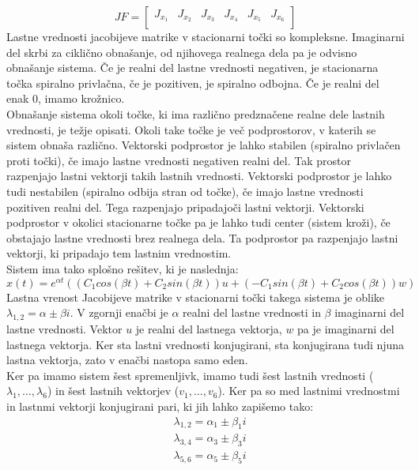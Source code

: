 \documentclass[a4paper, 12pt]{article}
\begin{document}
\begin{equation}
	JF =
	\begin{bmatrix}
		J_{x_{1}} & J_{x_{2}} & J_{x_{3}} & J_{x_{4}} & J_{x_{5}} & J_{x_{6}} \\
	\end{bmatrix}
\end{equation}
Lastne vrednosti jacobijeve matrike v stacionarni točki so kompleksne. Imaginarni del skrbi za ciklično obnašanje, od njihovega realnega dela pa
je odvisno obnašanje sistema. Če je realni del lastne vrednosti negativen, je stacionarna točka
spiralno privlačna, če je pozitiven, je spiralno odbojna. Če je realni del enak $ 0 $, imamo krožnico.\\
Obnašanje sistema okoli točke, ki ima različno predznačene realne dele lastnih vrednosti, je težje opisati. Okoli take točke je več podprostorov,
v katerih se sistem obnaša različno. Vektorski podprostor je lahko stabilen (spiralno privlačen proti točki), če imajo lastne vrednosti negativen realni del.
Tak prostor razpenjajo lastni vektorji takih lastnih vrednosti. Vektorski podprostor je lahko tudi nestabilen (spiralno odbija stran od točke), če imajo lastne vrednosti pozitiven
realni del. Tega razpenjajo pripadajoči lastni vektorji. Vektorski podprostor v okolici stacionarne točke pa je lahko tudi center (sistem kroži), če obstajajo
lastne vrednosti brez realnega dela. Ta podprostor pa razpenjajo lastni vektorji, ki pripadajo tem lastnim vrednostim.\\
Sistem ima tako splošno rešitev, ki je naslednja:
\begin{equation} \label{eq:13}
	x(t) = e^{\alpha t}((C_{1}cos(\beta t)+C_{2}sin(\beta t))u+(-C_{1}sin(\beta t)+C_{2}cos(\beta t))w)
\end{equation}
Lastna vrenost Jacobijeve matrike v stacionarni točki takega sistema je oblike $ \lambda_{1,2} = \alpha \pm \beta i $.
V zgornji enačbi je $ \alpha $ realni del lastne vrednosti in $ \beta $ imaginarni del lastne vrednosti.
Vektor $ u $ je realni del lastnega vektorja, $ w $ pa je imaginarni del lastnega vektorja. Ker sta lastni
vrednosti konjugirani, sta konjugirana tudi njuna lastna vektorja, zato v enačbi nastopa samo eden.\\
Ker pa imamo sistem šest spremenljivk, imamo tudi šest lastnih vrednosti ($ \lambda_{1}, \dots, \lambda_{6} $) in šest lastnih vektorjev
($ v_{1}, \dots, v_{6} $). Ker pa so med lastnimi vrednostmi in lastnmi vektorji konjugirani pari, ki jih lahko zapišemo tako:
\begin{align*}
	&\lambda_{1,2} = \alpha_{1} \pm \beta_{1}i \\
	&\lambda_{3,4} = \alpha_{3} \pm \beta_{3}i \\
	&\lambda_{5,6} = \alpha_{5} \pm \beta_{5}i \\
\end{align*}
\end{document}
